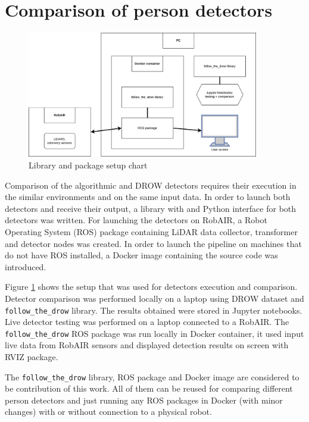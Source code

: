\documentclass{article}
\begin{document}
\section{Comparison of person detectors}

\begin{figure}[t!]
	\centering
	\includegraphics[width=0.9\textwidth]{ftd_setup_chart}
	\caption{Library and package setup chart}
	\label{fig:ftd_setup_chart}
\end{figure}

Comparison of the algorithmic and DROW detectors requires their execution in the similar environments and on the same input data.
In order to launch both detectors and receive their output, a library with and Python interface for both detectors was written.
For launching the detectors on RobAIR, a Robot Operating System (ROS)\cite{ros_site} package containing LiDAR data collector, transformer and detector nodes was created.
In order to launch the pipeline on machines that do not have ROS installed, a Docker image containing the source code was introduced.

Figure \ref{fig:ftd_setup_chart} shows the setup that was used for detectors execution and comparison.
Detector comparison was performed locally on a laptop using DROW dataset and \texttt{follow\_the\_drow} library.
The results obtained were stored in Jupyter notebooks.
Live detector testing was performed on a laptop connected to a RobAIR.
The \texttt{follow\_the\_drow} ROS package was run locally in Docker container, it used input live data from RobAIR sensors and displayed detection results on screen with RVIZ\cite{rviz_wiki} package.

The \texttt{follow\_the\_drow} library, ROS package and Docker image are considered to be contribution of this work.
All of them can be reused for comparing different person detectors and just running any ROS packages in Docker (with minor changes) with or without connection to a physical robot.
\end{document}
